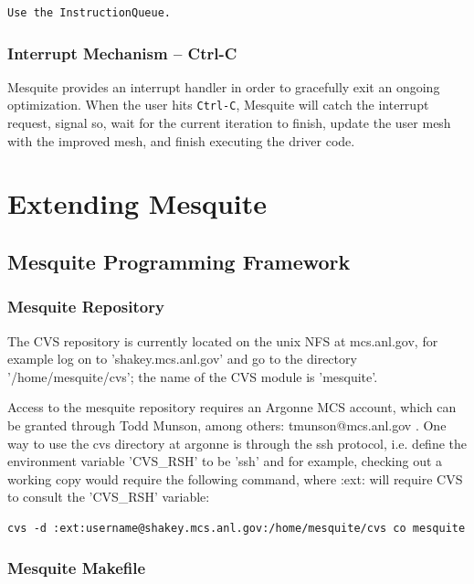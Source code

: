 \documentclass[letter]{report}
\begin{document}
\begin{verbatim}
Use the InstructionQueue. 
\end{verbatim}

\subsection{Interrupt Mechanism -- Ctrl-C} \label{sec:Ctrl-C}

Mesquite provides an interrupt handler in order to gracefully exit an ongoing optimization. When
the user hits \texttt{Ctrl-C}, Mesquite will catch the interrupt request, signal so, wait for the
current iteration to finish, update the user mesh with the improved mesh, and finish executing the
driver code.  

\chapter{Extending Mesquite}  \label{sec:extensions}

\section{Mesquite Programming Framework}

\subsection{Mesquite Repository} 

The CVS repository is currently located on the unix NFS at mcs.anl.gov, for example log on to
'shakey.mcs.anl.gov' and go to the directory '/home/mesquite/cvs'; the name of the CVS module is
'mesquite'.

Access to the mesquite repository requires an Argonne MCS account, which can be granted through Todd
Munson, among others: tmunson@mcs.anl.gov .
One way to use the cvs directory at argonne is through the ssh protocol, i.e. define the environment
variable 'CVS\_RSH' to be 'ssh' and for example, checking out a working copy would require the
following command, where :ext: will require CVS to consult the 'CVS\_RSH' variable: 
\begin{verbatim}
cvs -d :ext:username@shakey.mcs.anl.gov:/home/mesquite/cvs co mesquite
\end{verbatim}

\subsection{Mesquite Makefile} 
\end{document}
